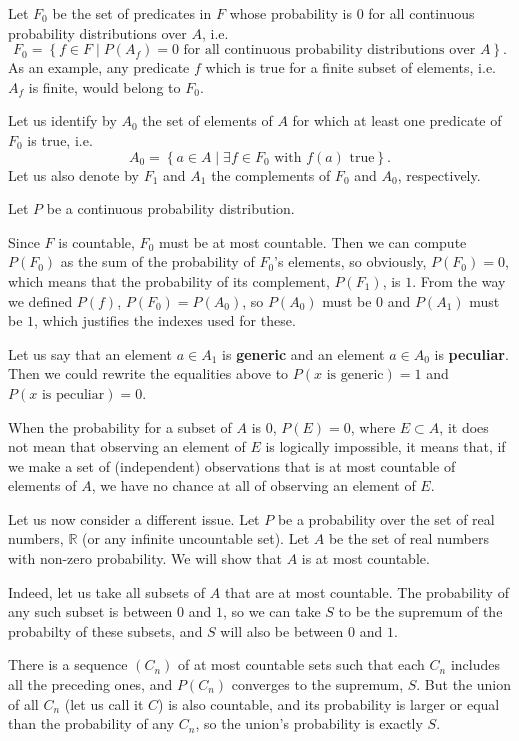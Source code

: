 \documentclass[a4paper
]{article}
\def\reale{\mathbb{R}}
\newcommand{\multime}[1]{\left\{ #1 \right\}}
\newcommand{\definitie}[1]{\textbf{#1}}
\begin{document}
Let $F_0$ be the set of predicates in $F$ whose probability is
$0$ for all continuous probability distributions over $A$, i.e.
$$F_0=\multime{
  f\in F
  \mid P(A_f)=0
    \mbox{ for all continuous probability distributions over } A}.
$$
As an example, any predicate $f$ which is true for a finite subset of elements,
i.e. $A_f$ is finite, would belong to $F_0$.

Let us identify by $A_0$ the
set of elements of $A$ for which at least one predicate of $F_0$ is true, i.e.
$$A_0=\multime{a \in A\mid \exists f\in F_0 \mbox{ with } f(a)\mbox{ true} }.$$
Let us also denote by $F_1$ and $A_1$ the complements of $F_0$ and $A_0$,
respectively.

Let $P$ be a continuous probability distribution.

Since $F$ is countable, $F_0$ must be at most countable. Then we can compute
$P(F_0)$ as the sum of the probability of $F_0$'s elements,
so obviously, $P(F_0)=0$,
which means that the probability of its complement, $P(F_1)$, is $1$.
From the way we defined $P(f)$, $P(F_0) = P(A_0)$, so $P(A_0)$ must be $0$
and $P(A_1)$ must be $1$, which justifies the indexes used for
these.

Let us say that an element $a\in A_1$ is \definitie{generic}
and an element $a\in A_0$ is \definitie{peculiar}. Then we could rewrite
the equalities above to $P(x\mbox{ is generic}) = 1$ and
$P(x\mbox{ is peculiar}) = 0$.

When the probability for a subset of $A$ is $0$, $P(E)=0$, where $E\subset A$,
it does not mean that observing an element of $E$ is logically impossible,
it means that,
if we make a set of (independent) observations that is at most countable
of elements of $A$, we have no chance at all of observing an element of $E$.

Let us now consider a different issue.
Let $P$ be a probability over the set of real numbers, $\reale$ (or
any infinite uncountable set).
Let $A$ be the set of real numbers with non-zero probability.
We will show that $A$ is at most countable.

Indeed, let us take all subsets of $A$ that are at most countable. The
probability of any such subset is between $0$ and $1$, so we can take
$S$ to be the supremum of the probabilty of these subsets, and
$S$ will also be between $0$ and $1$.

There is a sequence $(C_n)$ of at most countable sets such that each $C_n$
includes all the preceding ones, and $P(C_n)$ converges to the supremum, $S$.
But the union of all $C_n$ (let us call it $C$) is also countable,
and its probability is larger or equal than the probability of any $C_n$,
so the union's probability is exactly $S$.
\end{document}
